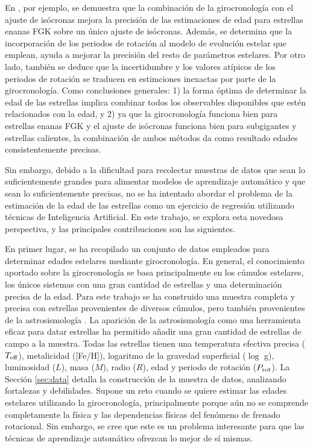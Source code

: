 En \cite{Angus19}, por ejemplo, se demuestra que la combinación de la girocronología con el ajuste de isócronas mejora la precisión de las estimaciones de edad para estrellas enanas FGK sobre un único ajuste de isócronas. Además, se determina que la incorporación de los periodos de rotación al modelo de evolución estelar que emplean, ayuda a mejorar la precisión del resto de parámetros estelares. Por otro lado, también se deduce que la incertidumbre y los valores atípicos de los periodos de rotación se traducen en estimciones inexactas por parte de la girocronología. Como conclusiones generales: 1) la forma óptima de determinar la edad de las estrellas implica combinar todos los observables disponibles que estén relacionados con la edad, y 2) ya que la girocronología funciona bien para estrellas enanas FGK y el ajuste de isócronas funciona bien para subgigantes y estrellas calientes, la combinación de ambos métodos da como resultado edades consistentemente precisas.



Sin embargo, debido a la dificultad para recolectar muestras de datos que sean lo suficientemente grandes para alimentar modelos de aprendizaje automático y que sean lo suficientemente precisas, no se ha intentado abordar el problema de la estimación de la edad de las estrellas como un ejercicio de regresión utilizando técnicas de Inteligencia Artificial. En este trabajo, se explora esta novedosa perspectiva, y las principales contribuciones son las siguientes.

En primer lugar, se ha recopilado un conjunto de datos empleados para determinar edades estelares mediante girocronología. En general, el conocimiento aportado sobre la girocronología se basa principalmente en los cúmulos estelares, los únicos sistemas con una gran cantidad de estrellas y una determinación precisa de la edad. Para este trabajo se ha construido una muestra completa y precisa con estrellas provenientes de diversos cúmulos, pero también provenientes de la astrosismología \cite{Angus15, Metcalfe19, Saders16}. La aparición de la astrosismología como una herramienta eficaz para datar estrellas ha permitido añadir una gran cantidad de estrellas de campo a la muestra. Todas las estrellas tienen una temperatura efectiva precisa ($T_{\rm eff}$), metalicidad ([Fe/H]), logaritmo de la gravedad superficial ($\log$ g), luminosidad ($L$), masa ($M$), radio ($R$), edad y periodo de rotación ($P_{\rm rot}$). La Sección \ref{sec:data} detalla la construcción de la muestra de datos, analizando fortalezas y debilidades. Supone un reto cuando se quiere estimar las edades estelares utilizando la girocronología, principalmente porque aún no se comprende completamente la física y las dependencias físicas del fenómeno de frenado rotacional. Sin embargo, se cree que este es un problema interesante para que las técnicas de aprendizaje automático ofrezcan lo mejor de sí mismas.

